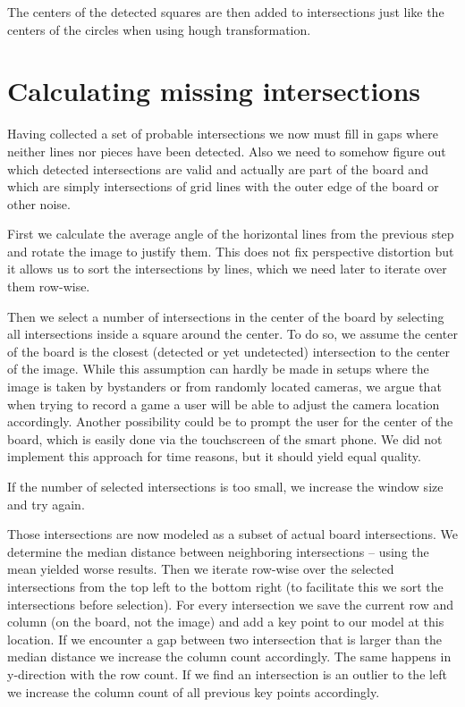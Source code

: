 	The centers of the detected squares are then added to intersections just like the centers of the circles when using hough transformation.

	\section{Calculating missing intersections}
	\label{detector-calculate}
	Having collected a set of probable intersections we now must fill in gaps where neither lines nor pieces have been detected. Also we need to somehow figure out which detected intersections are valid and actually are part of the board and which are simply intersections of grid lines with the outer edge of the board or other noise.

	First we calculate the average angle of the horizontal lines from the previous step and rotate the image to justify them. This does not fix perspective distortion but it allows us to sort the intersections by lines, which we need later to iterate over them row-wise.

	Then we select a number of intersections in the center of the board by selecting all intersections inside a square around the center. To do so, we assume the center of the board is the closest (detected or yet undetected) intersection to the center of the image. While this assumption can hardly be made in setups where the image is taken by bystanders or from randomly located cameras, we argue that when trying to record a game a user will be able to adjust the camera location accordingly. Another possibility could be to prompt the user for the center of the board, which is easily done via the touchscreen of the smart phone. We did not implement this approach for time reasons, but it should yield equal quality.

	If the number of selected intersections is too small, we increase the window size and try again.

	Those intersections are now modeled as a subset of actual board intersections. We determine the median distance between neighboring intersections -- using the mean yielded worse results. Then we iterate row-wise over the selected intersections from the top left to the bottom right (to facilitate this we sort the intersections before selection). For every intersection we save the current row and column (on the board, not the image) and add a key point to our model at this location. If we encounter a gap between two intersection that is larger than the median distance we increase the column count accordingly. The same happens in y-direction with the row count. If we find an intersection is an outlier to the left we increase the column count of all previous key points accordingly.


